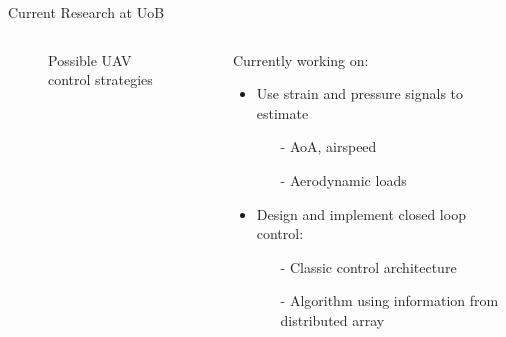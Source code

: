 \documentclass[aspectratio=169]{beamer}            %
\begin{document}
\begin{frame}{Current Research at UoB}

  \vspace{-1.5em}
	\begin{columns}
	  \begin{column}{0.6\textwidth}
		  \begin{figure}[!htb]
        \centering
				
				\caption{Possible UAV control strategies}
				\label{fig:ANN_UAVCtrl_BlockDiagram}
      \end{figure}
		\end{column}
    \begin{column}{0.4\textwidth}
		  Currently working on:
      \pause
      \begin{itemize}[<+->]
        \item{Use strain and pressure signals to estimate}
			  \begin{itemize}[<+->]
			    \item[-]{AoA, airspeed}
          \item[-]{Aerodynamic loads}
			  \end{itemize}
		    \item{Design and implement closed loop control:}
			  \begin{itemize}[<+->]
			    \item[-]{Classic control architecture}
          \item[-]{Algorithm using information from distributed array}
			  \end{itemize}
      \end{itemize}
		\end{column}
	\end{columns}

\end{frame}

\end{document}
